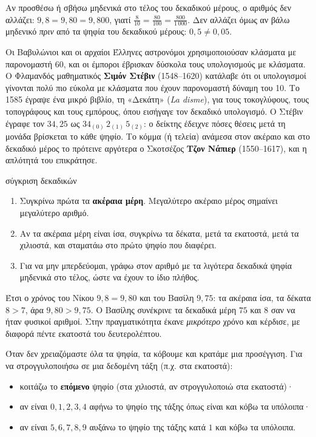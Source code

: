 Αν προσθέσω ή σβήσω μηδενικά στο τέλος του δεκαδικού μέρους, ο αριθμός δεν αλλάζει: $9{,}8=9{,}80=9{,}800$, γιατί $\frac{8}{10}=\frac{80}{100}=\frac{800}{1\,000}$. Δεν αλλάζει όμως αν βάλω μηδενικό \emph{πριν} από τα ψηφία του δεκαδικού μέρους: $0{,}5\neq 0{,}05$.


Οι Βαβυλώνιοι και οι αρχαίοι Έλληνες αστρονόμοι χρησιμοποιούσαν κλάσματα με παρονομαστή 60, και οι έμποροι έβρισκαν δύσκολα τους υπολογισμούς με κλάσματα. Ο Φλαμανδός μαθηματικός \textbf{Σιμόν Στέβιν} (1548--1620) κατάλαβε ότι οι υπολογισμοί γίνονται πολύ πιο εύκολα με κλάσματα που έχουν παρονομαστή δύναμη του 10. Το 1585 έγραψε ένα μικρό βιβλίο, τη «Δεκάτη» (\emph{La disme}), για τους τοκογλύφους, τους τοπογράφους και τους εμπόρους, όπου εισήγαγε τον δεκαδικό υπολογισμό. Ο Στέβιν έγραφε τον $34{,}25$ ως $34_{(0)}\,2_{(1)}\,5_{(2)}$: ο δείκτης έδειχνε πόσες θέσεις μετά τη μονάδα βρίσκεται το κάθε ψηφίο. Το κόμμα (ή τελεία) ανάμεσα στον ακέραιο και στο δεκαδικό μέρος το πρότεινε αργότερα ο Σκοτσέζος \textbf{Τζον Νάπιερ} (1550--1617), και η απλότητά του επικράτησε.


\begin{kanonas}{σύγκριση δεκαδικών}
\begin{enumerate}[leftmargin=1.6em,itemsep=0.3ex,topsep=2pt]
\item Συγκρίνω πρώτα τα \textbf{ακέραια μέρη}. Μεγαλύτερο ακέραιο μέρος σημαίνει μεγαλύτερο αριθμό.
\item Αν τα ακέραια μέρη είναι ίσα, συγκρίνω τα δέκατα, μετά τα εκατοστά, μετά τα χιλιοστά, και σταματάω στο πρώτο ψηφίο που διαφέρει.
\item Για να μην μπερδεύομαι, γράφω στον αριθμό με τα λιγότερα δεκαδικά ψηφία μηδενικά στο τέλος, ώστε να έχουν το ίδιο πλήθος.
\end{enumerate}
\end{kanonas}

Έτσι ο χρόνος του Νίκου $9{,}8=9{,}80$ και του Βασίλη $9{,}75$: τα ακέραια ίσα, τα δέκατα $8>7$, άρα $9{,}80>9{,}75$. Ο Βασίλης συνέκρινε τα δεκαδικά μέρη $75$ και $8$ σαν να ήταν φυσικοί αριθμοί. Στην πραγματικότητα έκανε \emph{μικρότερο} χρόνο και κέρδισε, με διαφορά πέντε εκατοστά του δευτερολέπτου.


Όταν δεν χρειαζόμαστε όλα τα ψηφία, τα κόβουμε και κρατάμε μια προσέγγιση. Για να στρογγυλοποιήσω σε μια δεδομένη τάξη (π.χ. στα εκατοστά):
\begin{itemize}[leftmargin=1.2em,itemsep=0.3ex,topsep=2pt]
\item κοιτάζω το \textbf{επόμενο} ψηφίο (στα χιλιοστά, αν στρογγυλοποιώ στα εκατοστά)·
\item αν είναι $0,1,2,3,4$ αφήνω το ψηφίο της τάξης όπως είναι και κόβω τα υπόλοιπα·
\item αν είναι $5,6,7,8,9$ αυξάνω το ψηφίο της τάξης κατά $1$ και κόβω τα υπόλοιπα.
\end{itemize}

